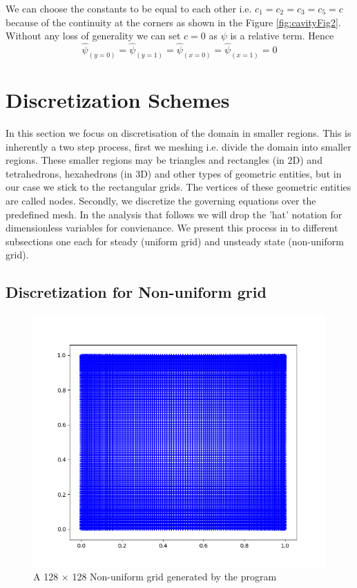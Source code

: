 \documentclass{article}
\begin{document}
We can choose the constants to be equal to each other i.e.  $c_1=c_2=c_3=c_5=c$ because of the continuity at the corners as shown in the Figure \ref{fig:cavityFig2}. Without any loss of generality we can set $c=0$ as $\psi$ is a relative term.
Hence
\begin{equation}
\hat{\psi}_{(y=0)}=\hat{\psi}_{(y=1)}=\hat{\psi}_{(x=0)}=\hat{\psi}_{(x=1)}=0
\end{equation}




\section{ Discretization Schemes}
In this section we focus on discretisation of the domain in smaller regions. This is inherently a two step process, first we meshing i.e. divide the domain into smaller regions. These smaller regions may be triangles and rectangles (in 2D) and tetrahedrons, hexahedrons (in 3D) and other types of geometric entities, but in our case we stick to the rectangular grids. The vertices of these geometric entities are called nodes. Secondly, we discretize the governing equations over the predefined mesh. In the analysis that follows we will drop the 'hat' notation for dimensionless variables for convienance. We present this process in to different subsections one each for steady (uniform grid) and unsteady state (non-uniform grid).

\subsection{Discretization for Non-uniform grid}
\begin{figure}[h!]
\centering
\includegraphics[scale=.5]{Figure_1.png}
\caption{A 128 $\times$ 128 Non-uniform grid generated by the program}
\label{fig:gridImage}
\end{figure}
\end{document}
